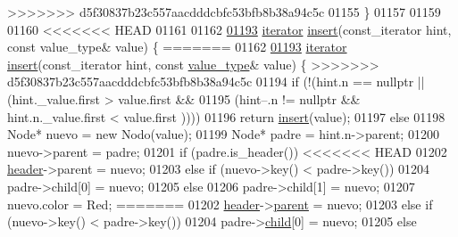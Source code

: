 \begin{DoxyCode}
>>>>>>> d5f30837b23c557aacdddcbfc53bfb8b38a94c5c
01155     \}
01157 
01159 
01160 
<<<<<<< HEAD
01161 
01162 
\hypertarget{map2_8h_source_l01193}{}\hyperlink{classaed2_1_1map_a6941cde9a79c27f054b5c97a587a1854_a6941cde9a79c27f054b5c97a587a1854}{01193}     \hyperlink{classaed2_1_1iterator}{iterator} \hyperlink{classaed2_1_1map_a6941cde9a79c27f054b5c97a587a1854_a6941cde9a79c27f054b5c97a587a1854}{insert}(const\_iterator hint, \textcolor{keyword}{const} value\_type& value) \{
=======
01162 
\hyperlink{classaed2_1_1map_a6941cde9a79c27f054b5c97a587a1854_a6941cde9a79c27f054b5c97a587a1854}{01193}     \hyperlink{classaed2_1_1iterator}{iterator} \hyperlink{classaed2_1_1map_a6941cde9a79c27f054b5c97a587a1854_a6941cde9a79c27f054b5c97a587a1854}{insert}(const\_iterator hint, \textcolor{keyword}{const} \hyperlink{classaed2_1_1map_a719db98e0ff9a837610f76be33264680_a719db98e0ff9a837610f76be33264680}{value\_type}& value) \{
>>>>>>> d5f30837b23c557aacdddcbfc53bfb8b38a94c5c
01194         \textcolor{keywordflow}{if} (!(hint.n == \textcolor{keyword}{nullptr} || (hint.\_value.first > value.first && 
01195             (hint--.n != \textcolor{keyword}{nullptr} && hint.n.\_value.first < value.first ))))
01196             \textcolor{keywordflow}{return} \hyperlink{classaed2_1_1map_a60aacba06b1579630b3c8e996cf248c8_a60aacba06b1579630b3c8e996cf248c8}{insert}(value);     
01197         \textcolor{keywordflow}{else}
01198             Node* nuevo = \textcolor{keyword}{new} Nodo(value);
01199             Node* padre = hint.n->parent;
01200             nuevo->parent = padre;
01201             \textcolor{keywordflow}{if} (padre.is\_header())
<<<<<<< HEAD
01202                 \hyperlink{classaed2_1_1map_a92d93f905c8ad73fba18fdc7e8915cce_a92d93f905c8ad73fba18fdc7e8915cce}{header}->parent = nuevo;
01203             \textcolor{keywordflow}{else} if (nuevo->key() < padre->key())
01204                 padre->child[0] = nuevo;
01205             \textcolor{keywordflow}{else}
01206                 padre->child[1] = nuevo;
01207             nuevo.color = Red;
=======
01202                 \hyperlink{classaed2_1_1map_a92d93f905c8ad73fba18fdc7e8915cce_a92d93f905c8ad73fba18fdc7e8915cce}{header}->\hyperlink{structaed2_1_1map_1_1Node_a91a1855da19d22344bc89c2f8b998a7a_a91a1855da19d22344bc89c2f8b998a7a}{parent} = nuevo;
01203             \textcolor{keywordflow}{else} if (nuevo->key() < padre->key())
01204                 padre->\hyperlink{structaed2_1_1map_1_1Node_acac3478cefbd8bebe0c3f3abb9a2935e_acac3478cefbd8bebe0c3f3abb9a2935e}{child}[0] = nuevo;
01205             \textcolor{keywordflow}{else}

\end{DoxyCode}
